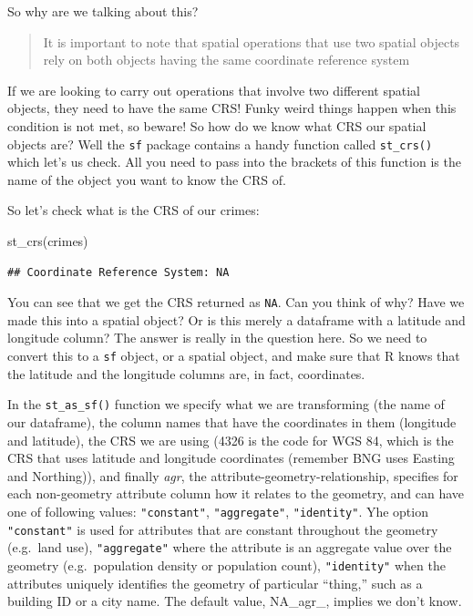 \documentclass[
  krantz2]{krantz}
\makeatletter
\newenvironment{Shaded}{\begin{snugshade}}{\end{snugshade}}
\newcommand{\FunctionTok}[1]{\textcolor[rgb]{0,0,0}{#1}}
\newcommand{\NormalTok}[1]{#1}
\newenvironment{kframe}{%
\medskip{}
\setlength{\fboxsep}{.8em}
 \def\at@end@of@kframe{}%
 \ifinner\ifhmode%
  \def\at@end@of@kframe{\end{minipage}}%
  \begin{minipage}{\columnwidth}%
 \fi\fi%
 \def\FrameCommand##1{\hskip\@totalleftmargin \hskip-\fboxsep
 \colorbox{shadecolor}{##1}\hskip-\fboxsep
     \hskip-\linewidth \hskip-\@totalleftmargin \hskip\columnwidth}%
 \MakeFramed {\advance\hsize-\width
   \@totalleftmargin\z@ \linewidth\hsize
   \@setminipage}}%
 {\par\unskip\endMakeFramed%
 \at@end@of@kframe}
\renewenvironment{Shaded}{\begin{kframe}}{\end{kframe}}
\makeatother
\begin{document}
So why are we talking about this?

\begin{quote}
It is important to note that spatial operations that use two spatial objects rely on both objects having the same coordinate reference system
\end{quote}

If we are looking to carry out operations that involve two different spatial objects, they need to have the same CRS! Funky weird things happen when this condition is not met, so beware! So how do we know what CRS our spatial objects are? Well the \texttt{sf} package contains a handy function called \texttt{st\_crs()} which let's us check. All you need to pass into the brackets of this function is the name of the object you want to know the CRS of.

So let's check what is the CRS of our crimes:

\begin{Shaded}
\begin{Highlighting}[]
\FunctionTok{st\_crs}\NormalTok{(crimes)}
\end{Highlighting}
\end{Shaded}

\begin{verbatim}
## Coordinate Reference System: NA
\end{verbatim}

You can see that we get the CRS returned as \texttt{NA}. Can you think of why? Have we made this into a spatial object? Or is this merely a dataframe with a latitude and longitude column? The answer is really in the question here. So we need to convert this to a \texttt{sf} object, or a spatial object, and make sure that R knows that the latitude and the longitude columns are, in fact, coordinates.

In the \texttt{st\_as\_sf()} function we specify what we are transforming (the name of our dataframe), the column names that have the coordinates in them (longitude and latitude), the CRS we are using (4326 is the code for WGS 84, which is the CRS that uses latitude and longitude coordinates (remember BNG uses Easting and Northing)), and finally \emph{agr}, the attribute-geometry-relationship, specifies for each non-geometry attribute column how it relates to the geometry, and can have one of following values: \texttt{"constant"}, \texttt{"aggregate"}, \texttt{"identity"}. Yhe option \texttt{"constant"} is used for attributes that are constant throughout the geometry (e.g.~land use), \texttt{"aggregate"} where the attribute is an aggregate value over the geometry (e.g.~population density or population count), \texttt{"identity"} when the attributes uniquely identifies the geometry of particular ``thing,'' such as a building ID or a city name. The default value, NA\_agr\_, implies we don't know.
\end{document}
